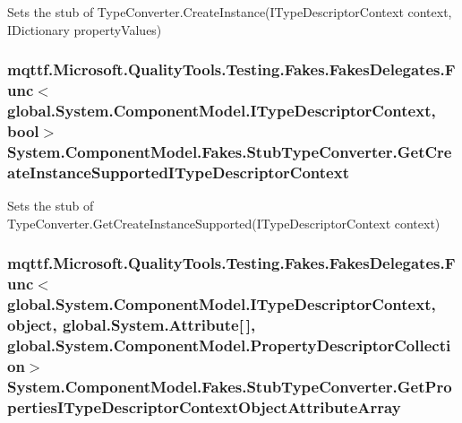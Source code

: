 Sets the stub of Type\-Converter.\-Create\-Instance(\-I\-Type\-Descriptor\-Context context, I\-Dictionary property\-Values)

\hypertarget{class_system_1_1_component_model_1_1_fakes_1_1_stub_type_converter_abd2af52f99b52461c964f5e4bfa85980}{
\subsubsection[{Get\-Create\-Instance\-Supported\-I\-Type\-Descriptor\-Context}]{\setlength{\rightskip}{0pt plus 5cm}mqttf.\-Microsoft.\-Quality\-Tools.\-Testing.\-Fakes.\-Fakes\-Delegates.\-Func$<$global.\-System.\-Component\-Model.\-I\-Type\-Descriptor\-Context, bool$>$ System.\-Component\-Model.\-Fakes.\-Stub\-Type\-Converter.\-Get\-Create\-Instance\-Supported\-I\-Type\-Descriptor\-Context}}\label{class_system_1_1_component_model_1_1_fakes_1_1_stub_type_converter_abd2af52f99b52461c964f5e4bfa85980}


Sets the stub of Type\-Converter.\-Get\-Create\-Instance\-Supported(\-I\-Type\-Descriptor\-Context context)

\hypertarget{class_system_1_1_component_model_1_1_fakes_1_1_stub_type_converter_a372cdfd896e541aea3e0fb637ae2acf5}{
\subsubsection[{Get\-Properties\-I\-Type\-Descriptor\-Context\-Object\-Attribute\-Array}]{\setlength{\rightskip}{0pt plus 5cm}mqttf.\-Microsoft.\-Quality\-Tools.\-Testing.\-Fakes.\-Fakes\-Delegates.\-Func$<$global.\-System.\-Component\-Model.\-I\-Type\-Descriptor\-Context, object, global.\-System.\-Attribute\mbox{[}$\,$\mbox{]}, global.\-System.\-Component\-Model.\-Property\-Descriptor\-Collection$>$ System.\-Component\-Model.\-Fakes.\-Stub\-Type\-Converter.\-Get\-Properties\-I\-Type\-Descriptor\-Context\-Object\-Attribute\-Array}}\label{class_system_1_1_component_model_1_1_fakes_1_1_stub_type_converter_a372cdfd896e541aea3e0fb637ae2acf5}


